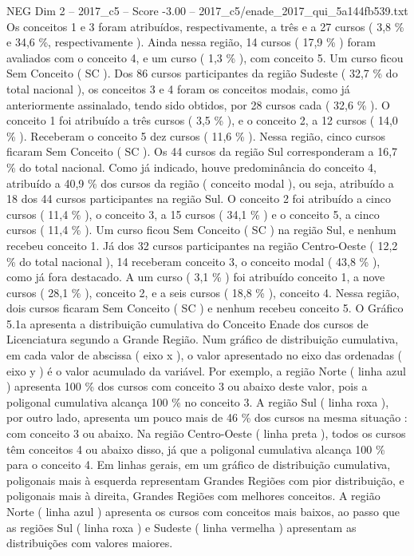 \begin{textsample}{NEG Dim 2 – 2017\_c5 – Score -3.00 – 2017\_c5/enade\_2017\_qui\_5a144fb539.txt}
Os conceitos 1 e 3 foram atribuídos, respectivamente, a três e a 27 cursos ( 3,8 \% e 34,6 \%, respectivamente ).
Ainda nessa região, 14 cursos ( 17,9 \% ) foram avaliados com o conceito 4, e um curso ( 1,3 \% ), com conceito 5.
Um curso ficou Sem Conceito ( SC ).
Dos 86 cursos participantes da região Sudeste ( 32,7 \% do total nacional ), os conceitos 3 e 4 foram os conceitos modais, como já anteriormente assinalado, tendo sido obtidos, por 28 cursos cada ( 32,6 \% ).
O conceito 1 foi atribuído a três cursos ( 3,5 \% ), e o conceito 2, a 12 cursos ( 14,0 \% ).
Receberam o conceito 5 dez cursos ( 11,6 \% ).
Nessa região, cinco cursos ficaram Sem Conceito ( SC ).
Os 44 cursos da região Sul corresponderam a 16,7 \% do total nacional.
Como já indicado, houve predominância do conceito 4, atribuído a 40,9 \% dos cursos da região ( conceito modal ), ou seja, atribuído a 18 dos 44 cursos participantes na região Sul.
O conceito 2 foi atribuído a cinco cursos ( 11,4 \% ), o conceito 3, a 15 cursos ( 34,1 \% ) e o conceito 5, a cinco cursos ( 11,4 \% ).
Um curso ficou Sem Conceito ( SC ) na região Sul, e nenhum recebeu conceito 1.
Já dos 32 cursos participantes na região Centro-Oeste ( 12,2 \% do total nacional ), 14 receberam conceito 3, o conceito modal ( 43,8 \% ), como já fora destacado.
A um curso ( 3,1 \% ) foi atribuído conceito 1, a nove cursos ( 28,1 \% ), conceito 2, e a seis cursos ( 18,8 \% ), conceito 4.
Nessa região, dois cursos ficaram Sem Conceito ( SC ) e nenhum recebeu conceito 5.
O Gráfico 5.1a apresenta a distribuição cumulativa do Conceito Enade dos cursos de Licenciatura segundo a Grande Região.
Num gráfico de distribuição cumulativa, em cada valor de abscissa ( eixo x ), o valor apresentado no eixo das ordenadas ( eixo y ) é o valor acumulado da variável.
Por exemplo, a região Norte ( linha azul ) apresenta 100 \% dos cursos com conceito 3 ou abaixo deste valor, pois a poligonal cumulativa alcança 100 \% no conceito 3.
A região Sul ( linha roxa ), por outro lado, apresenta um pouco mais de 46 \% dos cursos na mesma situação : com conceito 3 ou abaixo.
Na região Centro-Oeste ( linha preta ), todos os cursos têm conceitos 4 ou abaixo disso, já que a poligonal cumulativa alcança 100 \% para o conceito 4.
Em linhas gerais, em um gráfico de distribuição cumulativa, poligonais mais à esquerda representam Grandes Regiões com pior distribuição, e poligonais mais à direita, Grandes Regiões com melhores conceitos.
A região Norte ( linha azul ) apresenta os cursos com conceitos mais baixos, ao passo que as regiões Sul ( linha roxa ) e Sudeste ( linha vermelha ) apresentam as distribuições com valores maiores.

\end{textsample}
